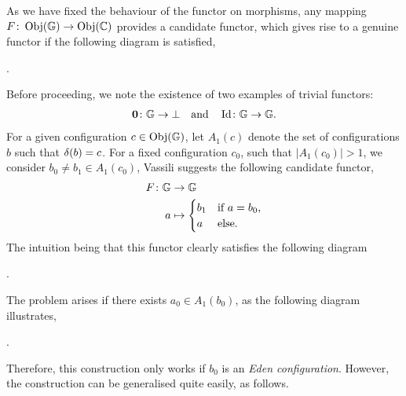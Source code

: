 \documentclass[11pt,a4paper]{amsart}
\begin{document}
\begin{REM}
  \label{rem:diagram} As we have fixed the behaviour of the functor on morphisms, any mapping $F\colon \operatorname{Obj}(\mathbb{G}) \to \operatorname{Obj}(\mathbb{C})$ provides a candidate functor, which gives rise to a genuine functor if the following diagram is satisfied, 
  \begin{center}
    .
  \end{center}
\end{REM}

Before proceeding, we note the existence of two  examples of trivial functors: 
\begin{align*}
  \textbf{0} \colon \mathbb{G} \to \bot \quad \text{and} \quad \operatorname{Id} \colon \mathbb{G} \to \mathbb{G}. 
\end{align*}
For a given configuration $c \in \operatorname{Obj}(\mathbb{G})$, let $A_1(c)$ denote the set of configurations $b$ such that $\delta(b)=c$. For a fixed configuration $c_0$, such that $|A_1(c_0)|>1$, we consider $b_0 \neq b_1 \in A_1(c_0)$, Vassili suggests the following candidate functor,
\begin{align*}
  F \colon \mathbb{G} &\to \mathbb{G}\\
  a &\mapsto
      \begin{cases}
        b_1 &\text{if $a = b_0$,}\\
        a &\text{else.}
      \end{cases}
\end{align*}
The intuition being that this functor clearly satisfies the following diagram
\begin{center}
  .
\end{center}
The problem arises if there exists $a_0 \in A_1(b_0)$, as the following diagram illustrates,
\begin{center}
  .
\end{center}
Therefore, this construction only works if $b_0$ is an \emph{Eden configuration}. However, the construction can be generalised quite easily, as follows.
\end{document}

